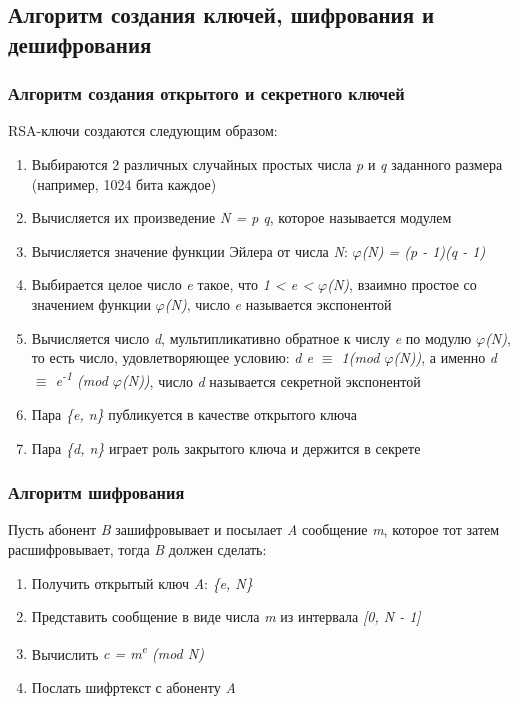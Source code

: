 \subsection{Алгоритм создания ключей, шифрования и дешифрования}

  \subsubsection{Алгоритм создания открытого и секретного ключей}
  RSA-ключи создаются следующим образом:
  
    \begin{enumerate}
     \item Выбираются 2 различных случайных простых числа \textit{p} и \textit{q} заданного размера (например, 1024 бита каждое)
     \item Вычисляется их произведение \textit{N = p q}, которое называется модулем
     \item Вычисляется значение функции Эйлера от числа \textit{N}: \textit{{$\varphi$}(N) = (p - 1)(q - 1)}
     \item Выбирается целое число \textit{e} такое, что \textit{1 < e < {$\varphi$}(N)}, взаимно простое со значением функции \textit{{$\varphi$}(N)}, 
     число \textit{e} называется экспонентой
     \item Вычисляется число \textit{d}, мультипликативно обратное к числу \textit{e} по модулю \textit{{$\varphi$}(N)}, то есть число, удовлетворяющее 
     условию: \textit{d e {$\equiv$} 1(mod {$\varphi$}(N))}, а именно \textit{d {$\equiv$} e\textsuperscript{-1} (mod {$\varphi$}(N))}, число \textit{d} 
     называется секретной экспонентой
     \item Пара \textit{\{e, n\}} публикуется в качестве открытого ключа
     \item Пара \textit{\{d, n\}} играет роль закрытого ключа и держится в секрете
    \end{enumerate}

  \subsubsection{Алгоритм шифрования}
  Пусть абонент \textit{B} зашифровывает и посылает \textit{A} сообщение \textit{m}, которое тот затем расшифровывает, тогда \textit{B} должен сделать:
  
    \begin{enumerate}
     \item Получить открытый ключ \textit{A}: \textit{\{e, N\}}
     \item Представить сообщение в виде числа \textit{m} из интервала \textit{[0, N - 1]}
     \item Вычислить \textit{c = m\textsuperscript{e} (mod N)}
     \item Послать шифртекст с абоненту \textit{A}
    \end{enumerate}
  
